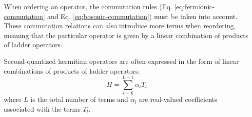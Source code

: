 When ordering an operator, the commutation rules (Eq. \ref{eq:fermionic-commutation} and Eq. \ref{eq:bosonic-commutation}) must be taken into account.
These commutation relations can also introduce more terms when reordering, meaning that the particular operator is given by a linear combination of products of ladder operators.

Second-quantized hermitian operators are often expressed in the form of linear combinations of products of ladder operators:
\begin{equation}
    \label{eq:lclo}
    H = \sum_{l=0}^{L-1} \alpha_l T_l
\end{equation}
where $L$ is the total number of terms and $\alpha_l$ are real-valued  coefficients associated with the terms $T_l$.
